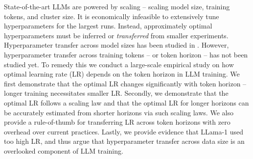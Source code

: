 State-of-the-art LLMs are powered by scaling -- scaling model size, training tokens, and cluster size. It is economically infeasible to extensively tune hyperparameters for the largest runs. Instead, approximately optimal hyperparameters must be inferred or \textit{transferred} from smaller experiments. Hyperparameter transfer across model sizes has been studied in \citet{mup}. However, hyperparameter transfer across training tokens -- or token horizon -- has not been studied yet. To remedy this we conduct a large-scale empirical study on how optimal learning rate (LR) depends on the token horizon in LLM training. We first demonstrate that the optimal LR changes significantly with token horizon -- longer training necessitates smaller LR. Secondly, we demonstrate that the optimal LR follows a scaling law and that the optimal LR for longer horizons can be accurately estimated from shorter horizons via such scaling laws. We also provide a rule-of-thumb for transferring LR across token horizons with zero overhead over current practices. Lastly, we provide evidence that LLama-1 used too high LR, and thus argue that hyperparameter transfer across data size is an overlooked component of LLM training.
